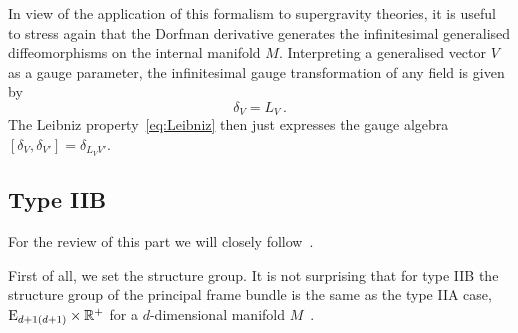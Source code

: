 \documentclass[debug]{phd}
\begin{document}
					In view of the application of this formalism to supergravity theories, it is useful to stress again that the Dorfman derivative generates the infinitesimal generalised diffeomorphisms on the internal manifold $M$. 
					Interpreting a generalised vector $V$ as a gauge parameter, the infinitesimal gauge transformation of any field is given by
							\begin{equation*}
								\delta_V = L_V \, .
							\end{equation*}
					The Leibniz property~\eqref{eq:Leibniz} then just expresses the gauge algebra $[\delta_V, \delta_{V'}] = \delta_{L_V V'}$. 
					
			\subsection{Type IIB}
				For the review of this part we will closely follow~\cite{AshmoreECY}.
				
				First of all, we set the structure group.
				It is not surprising that for type IIB the structure group of the principal frame bundle is the same as the type IIA case, $\mathrm{E}_{d+1(d+1)}\times \mathbb{R}^+$ for a $d$-dimensional manifold $M$~\cite{waldram5, spheres}.
\end{document}
